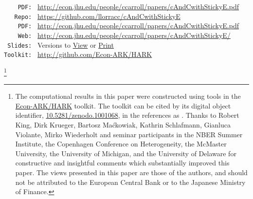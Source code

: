 \documentclass[titlepage]{\econtex}\newcommand{\texname}{cAndCwithStickyE}
\begin{document}
\parbox{\textwidth}{
  \begin{center}
\begin{tabbing}
  \texttt{~~~~PDF:~} \= \= \url{http://econ.jhu.edu/people/ccarroll/papers/cAndCwithStickyE.pdf} \kill \\  
\texttt{~~~Repo:~} \= \= \url{https://github.com/llorracc/cAndCwithStickyE}  \\
\texttt{~~~~PDF:~} \> \> \url{http://econ.jhu.edu/people/ccarroll/papers/cAndCwithStickyE.pdf} \\
\texttt{~~~~Web:~} \> \> \url{http://econ.jhu.edu/people/ccarroll/papers/cAndCwithStickyE/} \\
\texttt{~Slides:~} \> \> Versions to \href{http://econ.jhu.edu/people/ccarroll/papers/cAndCwithStickyE-Slides.pdf}{View} or \href{http://econ.jhu.edu/people/ccarroll/papers/cAndCwithStickyE-Slides-Print.pdf}{Print} \\
\texttt{Toolkit:~} \> \> \url{http://github.com/Econ-ARK/HARK} \\
\end{tabbing}
\end{center}
}

\begin{authorsinfo}
\end{authorsinfo}
\thanks{The computational results in this paper were constructed using tools in the \href{http://github.com/Econ-ARK/HARK}{Econ-ARK/HARK} toolkit.  The toolkit can be cited by its digital object identifier, \href{https://doi.org/10.5281/zenodo.1001068}{10.5281/zenodo.1001068}, in the references as \cite{matthew_n_white_2017_1001068}.  Thanks to Robert King, Dirk Krueger, Bartosz Ma\'ckowiak, Kathrin Schlafmann, Gianluca Violante, Mirko Wiederholt and seminar participants in the NBER Summer Institute, the Copenhagen Conference on Heterogeneity, the McMaster University, the University of Michigan, and the University of Delaware for constructive and insightful comments which substantially improved this paper. The views presented in this paper are those of the authors, and should not be attributed to the European Central Bank or to the Japanese Ministry of Finance.}
\end{document}
